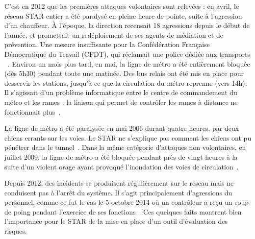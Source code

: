         C'est en 2012 que les premières attaques volontaires sont relevées : en avril, le réseau STAR entier a été paralysé en pleine heure de pointe, suite à l'agression d'un chauffeur. À l'époque, la direction recensait 18 agressions depuis le début de l'année, et promettait un redéploiement de ses agents de médiation et de prévention. Une mesure insuffisante pour la Confédération Française Démocratique du Travail (CFDT), qui réclamait \og une police dédiée aux transports \fg ~\cite{bus_agression}. Environ un mois plus tard, en mai, la ligne de métro a été entièrement bloquée (dès 5h30) pendant toute une matinée. Des bus relais ont été mis en place pour desservir les stations, jusqu'à ce que la circulation du métro reprenne (vers 14h). Il s’agissait d’un problème informatique entre le centre de commandement du métro et les rames : la liaison qui permet de contrôler les rames à distance ne fonctionnait plus~\cite{metro_info}. 
        
        La ligne de métro a été paralysée en mai 2006 durant quatre heures, par deux chiens errants sur les voies. Le STAR ne s'explique pas comment les chiens ont pu pénétrer dans le tunnel~\cite{chiens_metro}. Dans la même catégorie d'attaques non volontaires, en juillet 2009, la ligne de métro a été bloquée pendant près de vingt heures à la suite d'un violent orage ayant provoqué l'inondation des voies de circulation~\cite{metro_orage}.
        
        Depuis 2012, des incidents se produisent régulièrement sur le réseau mais ne conduisent pas à l'arrêt du système. Il s'agit principalement d'agressions du personnel, comme ce fut le cas le 5 octobre 2014 où un contrôleur a reçu un coup de poing pendant l'exercice de ses fonctions~\cite{coup_poing_rennes}. Ces quelques faits montrent bien l'importance pour le STAR de la mise en place d'un outil d'évaluation des risques.
